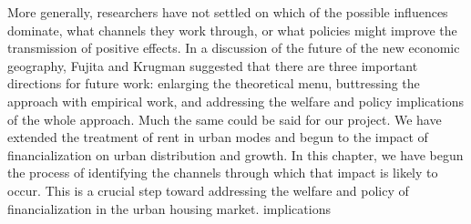  More generally, researchers have not settled on which of the possible influences dominate, what channels they work through, or what policies might improve the transmission of positive effects. %
In a discussion of the future of the new economic geography, Fujita and Krugman suggested that there are three important directions for future work: enlarging the theoretical menu, buttressing the approach with empirical work, and addressing the welfare and policy implications of the whole approach. Much the same could be said for our project. We have extended the treatment of rent in urban modes and begun to the impact of financialization on urban distribution and growth. In this chapter, we have begun the process of identifying the channels through which that impact is likely to occur. This is a crucial step toward addressing the welfare and policy of financialization in the urban housing market.
 implications











